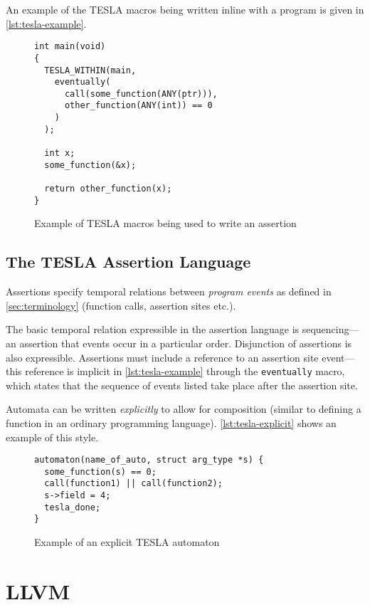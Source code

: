 An example of the TESLA macros being written inline with a program is
given in \autoref{lst:tesla-example}.

\begin{figure}
  \begin{verbatim}
int main(void)
{
  TESLA_WITHIN(main,
    eventually(
      call(some_function(ANY(ptr))),
      other_function(ANY(int)) == 0
    )
  );

  int x;
  some_function(&x);

  return other_function(x);
}
  \end{verbatim}
  \caption{Example of TESLA macros being used to write an assertion}
  \label{lst:tesla-example}
\end{figure}

\subsection{The TESLA Assertion Language} \label{sec:assertions}

Assertions specify temporal relations between \emph{program events} as defined
in \autoref{sec:terminology} (function calls, assertion sites etc.).

The basic temporal relation expressible in the assertion language is
sequencing---an assertion that events occur in a particular order. Disjunction
of assertions is also expressible. Assertions must include a reference to an
assertion site event---this reference is implicit in \autoref{lst:tesla-example}
through the \texttt{eventually} macro, which states that the sequence of
events listed take place after the assertion site.

Automata can be written \emph{explicitly} to allow for composition (similar to
defining a function in an ordinary programming language).
\autoref{lst:tesla-explicit} shows an example of this style.

\begin{figure}
  \begin{verbatim}
automaton(name_of_auto, struct arg_type *s) {
  some_function(s) == 0;
  call(function1) || call(function2);
  s->field = 4;
  tesla_done;
}
  \end{verbatim}
  \caption{Example of an explicit TESLA automaton}
  \label{lst:tesla-explicit}
\end{figure}

\section{LLVM}


